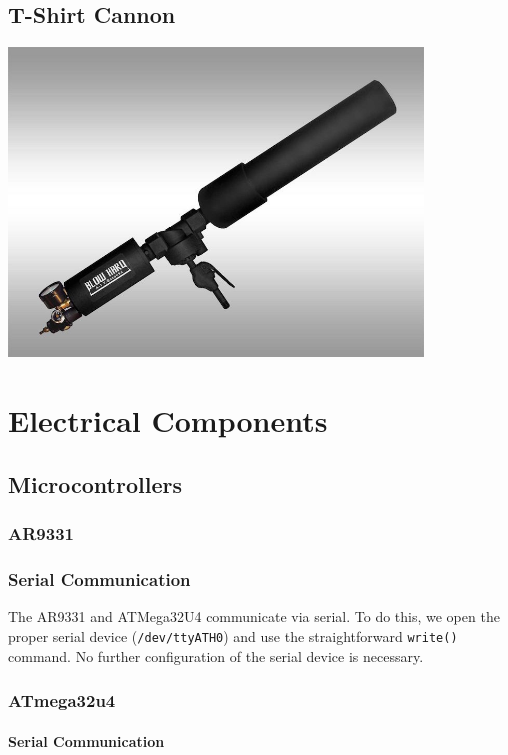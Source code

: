 \documentclass[letterpaper,12pt]{article}
\begin{document}
\subsection{T-Shirt Cannon}
\begin{center}
    \includegraphics[width=11cm]{pics/cannon/blowhard_cannon.jpg}
\end{center}

\section{Electrical Components}

\subsection{Microcontrollers}
\subsubsection{AR9331}

\subsubsection{Serial Communication}
\label{sec:ar9331_serial_com}
The AR9331 and ATMega32U4 communicate via serial. To do this, we open the proper
serial device (\texttt{/dev/ttyATH0}) and use the straightforward
\texttt{write()} command. No further configuration of the serial device is
necessary.

\subsubsection{ATmega32u4}

\paragraph{Serial Communication}
\label{sec:atmega_serial_com}
\end{document}
